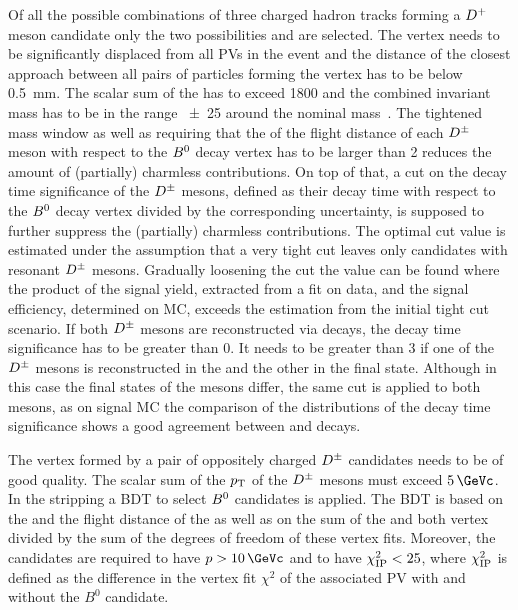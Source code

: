 Of all the possible combinations of three charged hadron tracks forming a
${{D}^+}$ meson candidate only the two possibilities \DToKpipi and \DToKKpi are
selected. The vertex needs to be significantly displaced from all PVs in the event
and the distance of the closest approach between all pairs of particles
forming the vertex has to be below \SI{0.5}{\mm}. The scalar sum of the \pT
has to exceed \SI{1800}{\MeVc} and the combined invariant mass has to be in
the range \SI{\pm25}{\MeVcc} around the nominal \Dp mass~\cite{PDG2014}. The
tightened mass window as well as requiring that the \chisq of the flight
distance of each ${{D}^\pm}$ meson with respect to the ${{B}^0}$ decay vertex has to be
larger than \num{2} reduces the amount of (partially) charmless contributions.
On top of that, a cut on the decay time significance of the ${{D}^\pm}$ mesons,
defined as their decay time with respect to the ${{B}^0}$ decay vertex divided by
the corresponding uncertainty, is supposed to further suppress the (partially)
charmless contributions. The optimal cut value is estimated under the
assumption that a very tight cut leaves only candidates with resonant ${{D}^\pm}$
mesons. Gradually loosening the cut the value can be found where the product
of the \Bd signal yield, extracted from a fit on data, and the signal
efficiency, determined on MC, exceeds the estimation from the initial tight
cut scenario. If both ${{D}^\pm}$ mesons are reconstructed via \DToKpipi decays, the
decay time significance has to be greater than \num{0}. It needs to be greater
than \num{3} if one of the ${{D}^\pm}$ mesons is reconstructed in the \KKpi and the
other in the \Kpipi final state. Although in this case the final states
of the \Dpm mesons differ, the same cut is applied to both \Dpm mesons, as on
signal MC the comparison of the distributions of the decay time significance
shows a good agreement between \DToKpipi and \DToKKpi decays.

The vertex formed by a pair of oppositely charged ${{D}^\pm}$ candidates needs to
be of good quality. The scalar sum of the $p_{\text{T}}$ of the ${{D}^\pm}$ mesons must
exceed $\SI{5}{\GeVc}$. In the stripping a BDT to select ${{B}^0}$ candidates is
applied. The BDT is based on the \pT and the flight distance \chisq of the \Bz
as well as on the sum of the \Bz and both \PD vertex \chisq divided by the
sum of the degrees of freedom of these vertex fits. Moreover, the \Bd
candidates are required to have $p > \SI{10}{\GeVc}$ and to have
$\chi^2_{\text{IP}}<\num{25}$, where $\chi^2_{\text{IP}}$ is defined as the difference in the
vertex fit $\chi^2$ of the associated PV with and without the $B^0$ candidate.

